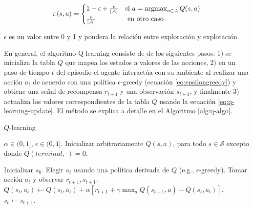 \begin{equation}\label{eq:epsilongreedy}
\pi(s,a) = 
  \begin{cases} 
      1 - \epsilon + \frac{\epsilon}{|\mathcal{A}|} & \mbox{si } a= 
      \operatorname*{argmax}_{a \in \mathcal{A}} 
      Q(s,a)   \\
      \frac{\epsilon}{|\mathcal{A}|} & \mbox{ en otro caso }
  \end{cases}
\end{equation}

$\epsilon$ es un valor entre 0 y 1 y pondera la relación entre
exploración y explotación.

En general, el algoritmo Q-learning consiste de de los siguientes pasos:
1) se inicializa la tabla $Q$ que mapea los estados a valores de las acciones,
2) en un paso de tiempo $t$ del episodio el agente interactúa con su ambiente al realizar una acción $a_t$ de acuerdo con una política $\epsilon$-greedy (ecuación \ref{eq:epsilongreedy}) y obtiene una señal de recompensa $r_{t+1}$ y una observación $s_{t+1}$, y finalmente 3) actualiza los valores
correspondientes de la tabla $Q$ usando la ecuación \ref{eq:q-learning-update}. El método
se explica a detalle en el Algoritmo \ref{alg:q-algo}.

\begin{mialgoritmo}[H]
  	\caption{$Q$-learning}
	\label{alg:q-algo}
  \begin{algorithmic}[1]
  \REQUIRE $\alpha \in (0,1]$, $\epsilon \in (0, 1]$.
  \STATE Inicializar arbitrariamente $Q(s,a)$, para todo $s\in \mathcal{S}$ excepto donde $Q(terminal, \cdot) = 0$.
  
    \STATE Inicializar $s_0$.
    \STATE Elegir $a_t$ usando una política derivada de $Q$ (e.g., $\epsilon$-greedy).
    \STATE Tomar acción $a_t$ y observar $r_{t+1}, s_{t+1}$.
    \STATE $Q(s_t, a_t) \leftarrow Q(s_t, a_t) + \alpha [r_{t+1} + \gamma \max_a Q(s_{t+1}, a) - Q(s_t, a_t)]$.
    \STATE $s_t \leftarrow s_{t+1}$.
    \ENDFOR
  \ENDFOR
  \end{algorithmic}
\end{mialgoritmo}

	
	
	
